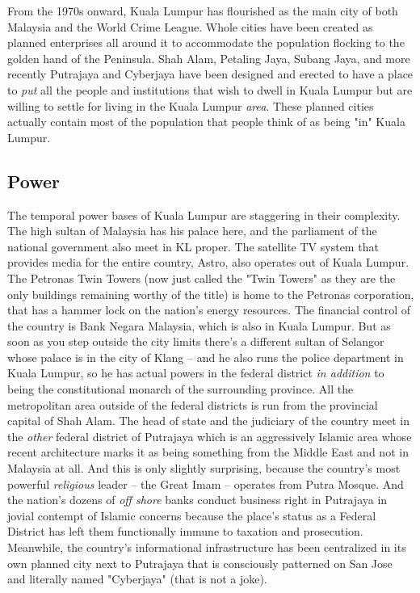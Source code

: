 From the 1970s onward, Kuala Lumpur has flourished as the main city of both Malaysia and the World Crime League. Whole cities have been created as planned enterprises all around it to accommodate the population flocking to the golden hand of the Peninsula. Shah Alam, Petaling Jaya, Subang Jaya, and more recently Putrajaya and Cyberjaya have been designed and erected to have a place to \textit{put} all the people and institutions that wish to dwell in Kuala Lumpur but are willing to settle for living in the Kuala Lumpur \textit{area}. These planned cities actually contain most of the population that people think of as being "in" Kuala Lumpur.

\subsection{Power}

\hspace{\parindent} The temporal power bases of Kuala Lumpur are staggering in their complexity. The high sultan of Malaysia has his palace here, and the parliament of the national government also meet in KL proper. The satellite TV system that provides media for the entire country, Astro, also operates out of Kuala Lumpur. The Petronas Twin Towers (now just called the "Twin Towers" as they are the only buildings remaining worthy of the title) is home to the Petronas corporation, that has a hammer lock on the nation's energy resources. The financial control of the country is Bank Negara Malaysia, which is also in Kuala Lumpur. But as soon as you step outside the city limits there's a different sultan of Selangor whose palace is in the city of Klang -- and he also runs the police department in Kuala Lumpur, so he has actual powers in the federal district \textit{in addition} to being the constitutional monarch of the surrounding province. All the metropolitan area outside of the federal districts is run from the provincial capital of Shah Alam. The head of state and the judiciary of the country meet in the \textit{other} federal district of Putrajaya which is an aggressively Islamic area whose recent architecture marks it as being something from the Middle East and not in Malaysia at all. And this is only slightly surprising, because the country's most powerful \textit{religious} leader -- the Great Imam -- operates from Putra Mosque. And the nation's dozens of \textit{off shore} banks conduct business right in Putrajaya in jovial contempt of Islamic concerns because the place's status as a Federal District has left them functionally immune to taxation and prosecution. Meanwhile, the country's informational infrastructure has been centralized in its own planned city next to Putrajaya that is consciously patterned on San Jose and literally named "Cyberjaya" (that is not a joke). 

